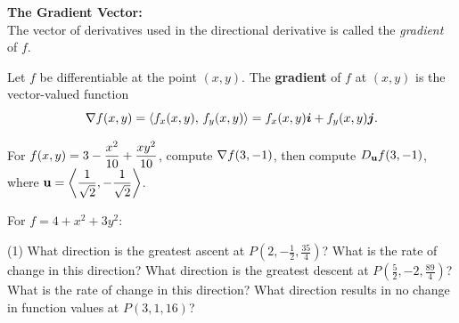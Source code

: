 \documentclass[mathNotesPreamble]{subfiles}
\begin{document}
  \noindent
  \textbf{The Gradient Vector:}\\
  The vector of derivatives used in the directional derivative is called the \textit{gradient} of $f$.
  \begin{defn*}
    Let $f$ be differentiable at the point $(x,y)$. The \textbf{gradient} of $f$ at $(x,y)$ is the vector-valued function
      \[\nabla f(x,y)={\left\langle f_x(x,y),\,f_y(x,y) \right\rangle}=f_x(x,y){\bm{i}}+f_y(x,y){\bm{j}}.\]
  \end{defn*}

  \begin{ex*}
    For $\displaystyle f(x,y)=3-\frac{x^2}{10}+\frac{xy^2}{10}$, compute $\nabla f(3,-1)$, then compute $D_{\mathbf{u}} f(3,-1)$, where $\displaystyle{\mathbf{u}}={\left\langle \frac{1}{\sqrt{2}},-\frac{1}{\sqrt{2}} \right\rangle}$.
  \end{ex*}

  \noindent
  \pagebreak

  \begin{ex*}
    For $f=4+x^2+3y^2$: 
  \end{ex*}
  \begin{tasks}[after-item-skip=\stretch{1}, label=](1)
    \task What direction is the greatest ascent at $P(2,-\frac{1}{2}, \frac{35}{4})$? What is the rate of change in this direction?
    \task What direction is the greatest descent at $P(\frac{5}{2},-2, \frac{89}{4})$? What is the rate of  change in this direction?
    \task What direction results in no change in function values at $P(3,1, 16)$?
  \end{tasks}
  \pagebreak
\end{document}
